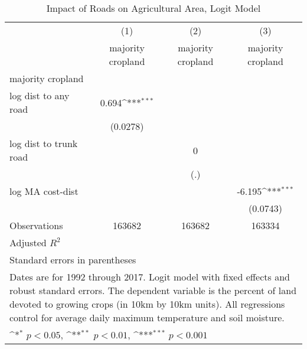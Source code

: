 \begin{table}[htbp]\centering
\def\sym#1{\ifmmode^{#1}\else\(^{#1}\)\fi}
\caption{Impact of Roads on Agricultural Area, Logit Model}
\begin{tabular}{l*{3}{c}}
\hline\hline
                    &\multicolumn{1}{c}{(1)}&\multicolumn{1}{c}{(2)}&\multicolumn{1}{c}{(3)}\\
                    &\multicolumn{1}{c}{majority cropland}&\multicolumn{1}{c}{majority cropland}&\multicolumn{1}{c}{majority cropland}\\
\hline
majority cropland   &                     &                     &                     \\
log dist to any road&       0.694\sym{***}&                     &                     \\
                    &    (0.0278)         &                     &                     \\
[1em]
log dist to trunk road&                     &           0         &                     \\
                    &                     &         (.)         &                     \\
[1em]
log MA cost-dist    &                     &                     &      -6.195\sym{***}\\
                    &                     &                     &    (0.0743)         \\
\hline
Observations        &      163682         &      163682         &      163334         \\
Adjusted \(R^{2}\)  &                     &                     &                     \\
\hline\hline
\multicolumn{4}{l}{\footnotesize Standard errors in parentheses}\\
\multicolumn{4}{l}{\footnotesize Dates are for 1992 through 2017. Logit model with fixed effects and robust standard errors. The dependent variable is the percent of land devoted to growing crops (in 10km by 10km units). All regressions control for average daily maximum temperature and soil moisture.}\\
\multicolumn{4}{l}{\footnotesize \sym{*} \(p<0.05\), \sym{**} \(p<0.01\), \sym{***} \(p<0.001\)}\\
\end{tabular}
\end{table}

